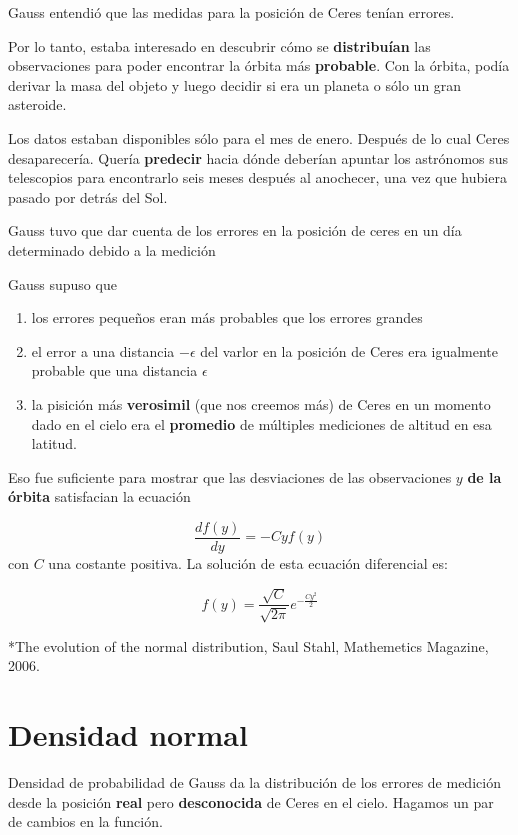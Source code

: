 \documentclass[
]{book}
\begin{document}
Gauss entendió que las medidas para la posición de Ceres tenían errores.

Por lo tanto, estaba interesado en descubrir cómo se \textbf{distribuían} las observaciones para poder encontrar la órbita más \textbf{probable}. Con la órbita, podía derivar la masa del objeto y luego decidir si era un planeta o sólo un gran asteroide.

Los datos estaban disponibles sólo para el mes de enero. Después de lo cual Ceres desaparecería. Quería \textbf{predecir} hacia dónde deberían apuntar los astrónomos sus telescopios para encontrarlo seis meses después al anochecer, una vez que hubiera pasado por detrás del Sol.

Gauss tuvo que dar cuenta de los errores en la posición de ceres en un día determinado debido a la medición

Gauss supuso que

\begin{enumerate}
\def\labelenumi{\arabic{enumi})}
\item
  los errores pequeños eran más probables que los errores grandes
\item
  el error a una distancia \(-\epsilon\) del varlor en la posición de Ceres era igualmente probable que una distancia \(\epsilon\)
\item
  la pisición más \textbf{verosimil} (que nos creemos más) de Ceres en un momento dado en el cielo era el \textbf{promedio} de múltiples mediciones de altitud en esa latitud.
\end{enumerate}

Eso fue suficiente para mostrar que las desviaciones de las observaciones \(y\) \textbf{de la órbita} satisfacian la ecuación

\[\frac{df(y)}{dy}=-Cyf(y)\]
con \(C\) una costante positiva. La solución de esta ecuación diferencial es:

\[f(y)=\frac{\sqrt{C}}{\sqrt{2\pi}}e^{-\frac{Cy^2}{2}}\]

*The evolution of the normal distribution, Saul Stahl, Mathemetics Magazine, 2006.

\hypertarget{densidad-normal}{%
\section{Densidad normal}\label{densidad-normal}}

Densidad de probabilidad de Gauss da la distribución de los errores de medición desde la posición \textbf{real} pero \textbf{desconocida} de Ceres en el cielo. Hagamos un par de cambios en la función.
\end{document}
